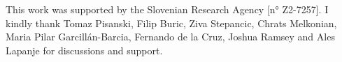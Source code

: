 \documentclass[sigconf]{acmart}
\begin{document}
\begin{acks}
This work was supported by the Slovenian Research Agency [n° Z2-7257]. I kindly thank Tomaz Pisanski, Filip Buric, Ziva Stepancic, Chrats Melkonian, Maria Pilar Garcillán-Barcia, Fernando de la Cruz, Joshua Ramsey and Ales Lapanje for discussions and support.
\end{acks}



\end{document}
